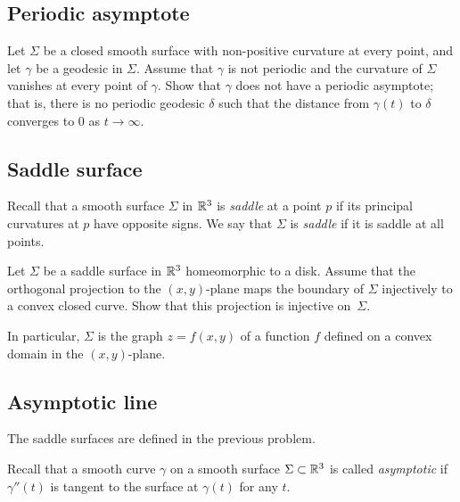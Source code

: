 \subsection*{Periodic asymptote}
\label{Asymptotic geodesic}

\begin{pr}
Let $\Sigma$ be a closed smooth surface with non-positive curvature at every point,
and let $\gamma$ be a geodesic in $\Sigma$.
Assume that $\gamma$ is not periodic
and the curvature of $\Sigma$ vanishes at every point of $\gamma$.
Show that $\gamma$ does not have a periodic asymptote;
that is, there is no periodic geodesic $\delta$ such that the distance from $\gamma(t)$ to $\delta$  converges to $0$ as $t\to\infty$.
\end{pr}

\subsection*{Saddle surface}
\label{Saddle surface}

Recall that a smooth surface $\Sigma$ in $\mathbb{R}^3$
is \emph{saddle} at a point $p$ if its principal curvatures at $p$ have opposite signs.
We say that $\Sigma$ is {}\emph{saddle} if it is saddle at all points.

\begin{pr}
Let $\Sigma$ be a saddle surface in $\mathbb{R}^3$
homeomorphic to a disk.
Assume that the orthogonal projection to the $(x,y)$-plane
maps the boundary of $\Sigma$
injectively to a convex closed curve.
Show that this projection is injective on~$\Sigma$.

In particular, $\Sigma$ is the graph $z=f(x,y)$ of a function $f$ defined on a convex domain in the $(x,y)$-plane.
\end{pr}


\subsection*{Asymptotic line}
\label{asymptotic-line}

The saddle surfaces are defined in the previous problem.

Recall that a smooth curve $\gamma$ on a smooth surface $\Sigma\subset \mathbb{R}^3$ is called \emph{asymptotic} if $\gamma''(t)$ is tangent to the surface at $\gamma(t)$ for any $t$.

